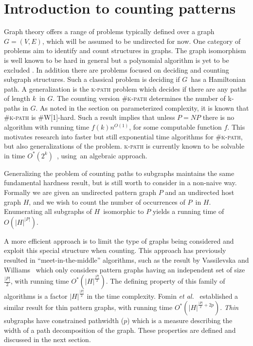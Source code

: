 \documentclass[a4paper,11pt]{report}
\theoremstyle{plain}
\theoremstyle{definition}
\begin{document}
\section{Introduction to counting patterns}
Graph theory offers a range of problems typically defined over a graph $G = (V, E)$, which will be assumed to be undirected for now.
One category of problems aim to identify and count structures in graphs.
The graph isomorphism is well known to be hard in general but a polynomial algorithm is yet to be excluded \cite{KOBLER94}.
In addition there are problems focused on deciding and counting subgraph structures.
Such a classical problem is deciding if $G$ has a Hamiltonian path.
A generalization is the \textsc{k-path} problem which decides if there are any paths of length $k$ in $G$.
The counting version \textsc{\#k-path} determines the number of k-paths in $G$.
As noted in the section on parameterized complexity, it is known that \textsc{\#k-path} is \textsc{\#W[1]}-hard.
Such a result implies that unless $P=NP$ there is no algorithm with running time $f(k)n^{O(1)}$, for some computable function $f$.
This motivates research into faster but still exponential time algorithms for \textsc{\#k-path}, but also generalizations of the problem.
\textsc{k-path} is currently known to be solvable in time $O^*(2^k)$ \cite{W09}, using an algebraic approach.

Generalizing the problem of counting paths to subgraphs maintains the same fundamental hardness result, but is still worth to consider in a non-naive way.
Formally we are given an undirected pattern graph $P$ and an undirected host graph $H$, and we wish to count the number of occurrences of $P$ in $H$.
Enumerating all subgraphs of $H$ isomorphic to $P$ yields a running time of $O(|H|^{|P|})$.

A more efficient approach is to limit the type of graphs being considered and exploit this special structure when counting.
This approach has previously resulted in ``meet-in-the-middle'' algorithms, such as the result by Vassilevska and Williams~\cite{VW09} which only considers pattern graphs having an independent set of size $\frac{|P|}{2}$,
with running time $O^*(|H|^{\frac{|P|}{2}})$.
The defining property of this family of algorithms is a factor $|H|^{\frac{|P|}{2}}$ in the time complexity.
Fomin \emph{et al.}~\cite{FLRRS12} established a similar result for thin pattern graphs, with running time $O^*(|H|^{\frac{|P|}{2} + 2p})$.
\emph{Thin} subgraphs have constrained pathwidth ($p$) which is a measure describing the width of a path decomposition of the graph.
These properties are defined and discussed in the next section.
\end{document}
